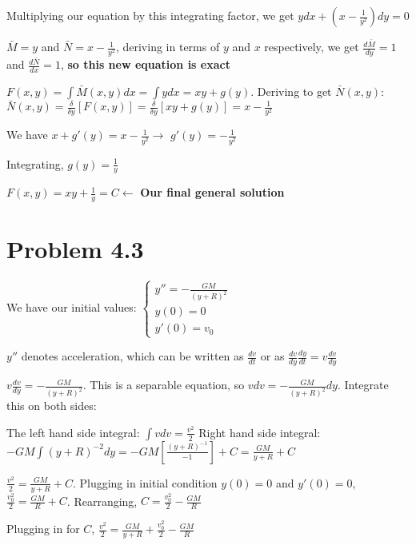 \documentclass{article}
\begin{document}
\noindent Multiplying our equation by this integrating factor, we get $ydx + (x - \frac{1}{y^{2}})dy = 0$ \par

\noindent $\bar{M} = y$ and $\bar{N} = x - \frac{1}{y^{2}}$, deriving in terms of $y$ and $x$ respectively, we get $\frac{d\bar{M}}{dy} = 1$ and $\frac{d\bar{N}}{dx} = 1$, \textbf{so this new equation is exact} \par\vspace{0.25cm}

\noindent $F(x, y) = \int \bar{M}(x, y)dx = \int ydx = xy + g(y)$.  Deriving to get $\bar{N}(x, y)$: $\bar{N}(x, y) = \frac{\delta}{\delta y}[F(x, y)] = \frac{\delta}{\delta y}[xy + g(y)] = x - \frac{1}{y^{2}}$ \par
\noindent We have $x + g'(y) = x - \frac{1}{y^{2}} \rightarrow$ $g'(y) = -\frac{1}{y^{2}}$ \par
\noindent Integrating, $g(y) = \frac{1}{y}$ \par\vspace{0.25cm}

\noindent $F(x, y) = xy + \frac{1}{y} = C \leftarrow$ \textbf{Our final general solution}

\section{Problem 4.3}

We have our initial values:
$\begin{cases}
    y'' = -\frac{GM}{(y + R)^{2}} \\
    y(0) = 0 \\
    y'(0) = v_{0}
    \end{cases}$ \par\vspace{0.25cm}
    
\noindent $y''$ denotes acceleration, which can be written as $\frac{dv}{dt}$ or as $\frac{dv}{dy}\frac{dy}{dt} = v\frac{dv}{dy}$ \par
\noindent $v\frac{dv}{dy} = -\frac{GM}{(y + R)^{2}}$.  This is a separable equation, so $vdv = -\frac{GM}{(y + R)^{2}}dy$.  Integrate this on both sides: \par
\noindent The left hand side integral: $\int vdv = \frac{v^{2}}{2}$  Right hand side integral: $-GM\int (y + R)^{-2}dy = -GM[\frac{(y + R)^{-1}}{-1}] + C = \frac{GM}{y + R} + C$ \par

\noindent $\frac{v^{2}}{2} = \frac{GM}{y + R} + C$.  Plugging in initial condition $y(0) = 0$ and $y'(0) = 0$, $\frac{v_{0}^{2}}{2} = \frac{GM}{R} + C$.  Rearranging, $C = \frac{v_{0}^{2}}{2} - \frac{GM}{R}$ \par
\noindent Plugging in for $C$, $\frac{v^{2}}{2} = \frac{GM}{y + R} + \frac{v_{0}^{2}}{2} - \frac{GM}{R}$ \par\vspace{0.25cm}
\end{document}
